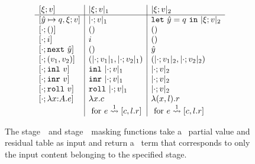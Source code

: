 %

\begin{figure}
\[\begin{array}{l|l|l}
[\xi;v] & \masko{\xi;v} & \maskt{\xi;v} \\ \hline
[\hat y \mapsto q,\xi;v]
  & \masko{\cdot;v}
  & \letin {\hat y} q {\maskt{\xi;v}} \\\relax
[\cdot;()] 
  & ()
  & () \\\relax
[\cdot;i] 
  & i
  & () \\\relax
[\cdot;\next~\hat y] 
  & ()
  & \hat y \\\relax
[\cdot;(v_1,v_2)] 
  & (\masko {\cdot;v_1},\masko {\cdot;v_2})
  & (\maskt {\cdot;v_1},\maskt {\cdot;v_2}) \\\relax
[\cdot;\inl~v] 
  & \inl~\masko{\cdot;v}
  & \maskt {\cdot;v} \\\relax
[\cdot;\inr~v] 
  & \inr~\masko{\cdot;v}
  & \maskt {\cdot;v} \\\relax
[\cdot;\roll~v] 
  & \roll~\masko{\cdot;v}
  & \maskt {\cdot;v} \\\relax
[\cdot;\lam xAe]
  & \lambda x.c 
  & \lambda (x,l).r \\
& \text{ for } \splitone e A {c,l.r}
& \text{ for } \splitone e A {c,l.r}
\end{array}\]

\caption{The stage~\bbone\ and stage~\bbtwo\ masking functions take a \lang\ partial value and residual table as input
and return a \langmono\ term that corresponds to only the input content belonging to the specified stage.}
\label{fig:valMask}
\end{figure}

